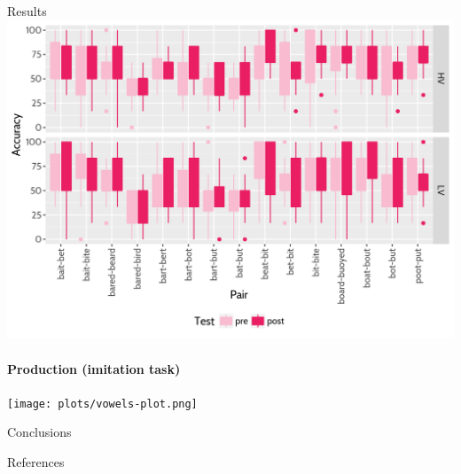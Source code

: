 \documentclass[final,xcolor={cmyk,hyperref}]{beamer}
\begin{document}
\begin{frame}[t]
\begin{columns}[t]
\begin{column}{0.5\linewidth}
\begin{block}{Results}
\includegraphics[width=\linewidth]{plots/axb-boxplot.png}

\paragraph{Production (imitation task)}

\medskip

\texttt{[image: plots/vowels-plot.png]}

\end{block}

\begin{block}{Conclusions}

\end{block}

\begin{block}{References}
  \renewcommand\bibfont{\tiny}
  \printbibliography
\end{block}


\end{column}

\end{columns}

\end{frame}
\end{document}

